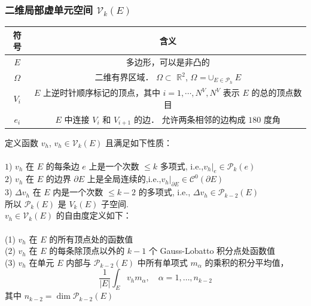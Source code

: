       \subsubsection{二维局部虚单元空间 $\mathcal V_k(E)$}
     \begin{table}[H]
     	\centering
     \begin{tabular}{ cc }   
     	\hline
     	符号 & 含义 \\
     	\hline
     	$E$ & 多边形，可以是非凸的 \\
     	
     	$\Omega$ & 二维有界区域． $\Omega$$\subset$ $\mathbb{R}^2$, $\Omega$ =$\cup_{E\in \mathcal{P}_h}E$ \\
     
     	$V_i$ & $E$ 上逆时针顺序标记的顶点，其中 $i = 1,\cdots, N^V,N^V$ 表示 $E$ 的总的顶点数目 \\
     	
     	$e_i$ & $E$ 中连接 $V_i$ 和 $V_{i+1}$ 的边． 允许两条相邻的边构成 $180$ 度角 \\
     	\hline
     \end{tabular}
     \end{table}
     
    定义函数 $v_h$, $v_h\in\mathcal V_k(E)$ 且满足如下性质：\\
    \\
    $1$) $v_h$ 在 $E$ 的每条边 $e$ 上是一个次数 $\le k$ 多项式, i.e.,$v_h|_e \in \mathcal P_k(e)$\\
    $2$) $v_h$ 在 $E$ 的边界 $\partial E$ 上是全局连续的,i.e.,$v_h|_{\partial E} \in \mathcal C^0(\partial E)$\\
    $3$) $\Delta v_h$ 在 $E$ 内是一个次数 $\le k - 2$ 的多项式, i.e., $\Delta v_h \in \mathcal P_{k-2}(E)$\\
    
    所以 $\mathcal{P}_k(E)$ 是 $V_k(E)$ 子空间. \\
    
    $v_h\in \mathcal V_k(E)$ 的自由度定义如下：\\
    \\
    (1) $v_h$ 在 $E$ 的所有顶点处的函数值\\
    (2) $v_h$ 在 $E$ 的每条除顶点以外的 $k-1$ 个 Gauss-Lobatto 积分点处函数值 \\ 
    (3) $v_h$ 在单元 $E$ 内部与 $\mathcal P_{k-2}(E)$ 中所有单项式 $m_\alpha$ 的乘积的积分平均值， $$ \frac{1}{|E|}\int_E v_h m_\alpha, \quad \alpha = 1, \ldots, n_{k-2}$$
    其中 $n_{k-2} = \dim \mathcal P_{k-2}(E)$\\
    
